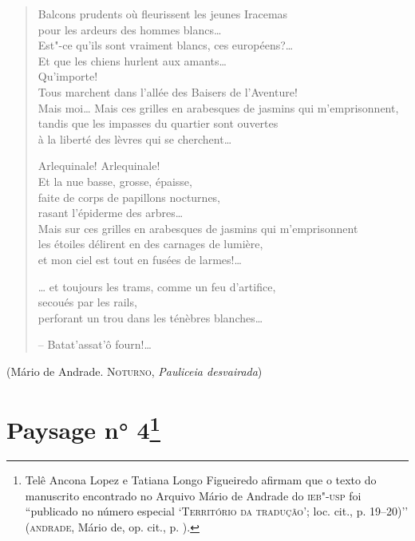 \begin{verse}
Balcons prudents où fleurissent les jeunes Iracemas\\
pour les ardeurs des hommes blancs\ldots{}\\
Est"-ce qu'ils sont vraiment blancs, ces européens?\ldots{}\\
Et que les chiens hurlent aux amants\ldots{}\\
Qu'importe!\\
Tous marchent dans l'allée des Baisers de l'Aventure!\\
Mais moi\ldots{} Mais ces grilles en arabesques de jasmins qui m'emprisonnent,\\
tandis que les impasses du quartier sont ouvertes\\
à la liberté des lèvres qui se cherchent\ldots{}

Arlequinale! Arlequinale!\\
Et la nue basse, grosse, épaisse,\\
faite de corps de papillons nocturnes,\\
rasant l'épiderme des arbres\ldots{}\\
Mais sur ces grilles en arabesques de jasmins qui m'emprisonnent\\
les étoiles délirent en des carnages de lumière,\\
et mon ciel est tout en fusées de larmes!\ldots{}

\ldots{} et toujours les trams, comme un feu d'artifice,\\
secoués par les rails,\\
perforant un trou dans les ténèbres blanches\ldots{}

-- Batat'assat'ô fourn!\ldots{}
\end{verse}

\hfill(Mário de Andrade\textsc{. Noturno,} \emph{Pauliceia desvairada}\textsc{)}

\pagebreak
\section{Paysage n° 4\footnote[*]{Telê Ancona Lopez e Tatiana Longo
  Figueiredo afirmam que o texto do manuscrito encontrado no Arquivo
  Mário de Andrade do \textsc{ieb"-usp} foi ``publicado no número especial
  `\textsc{Território da tradução'}; loc. cit., p. 19--20)'' (\textsc{andrade},
  Mário de, op. cit., p. ).}}

